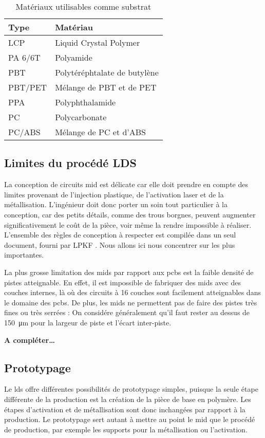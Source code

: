 \begin{table}[h]
\centering
\begin{tabular}{l l}
\toprule 
Type & Matériau \\
\midrule %
LCP & Liquid Crystal Polymer \\
PA 6/6T & Polyamide \\
PBT & Polytéréphtalate de butylène \\
PBT/PET & Mélange de PBT et de PET \\
PPA & Polyphthalamide \\
PC & Polycarbonate \\
PC/ABS & Mélange de PC et d'ABS \\ 
\bottomrule 
\end{tabular}
\caption{Matériaux utilisables comme substrat}
\label{tab:mid-materials}
\end{table}

\subsection{Limites du procédé LDS}
La conception de circuits \gls{mid} est délicate car elle doit prendre en compte des limites provenant de l'injection plastique, de l'activation laser et de la métallisation.
L'ingénieur doit donc porter un soin tout particulier à la conception, car des petits détails, comme des trous borgnes, peuvent augmenter significativement le coût de la pièce, voir même la rendre impossible à réaliser.
L'ensemble des règles de conception à respecter est compilée dans un seul document, fourni par LPKF \cite{mid-design-rules}.
Nous allons ici nous concentrer sur les plus importantes.

La plus grosse limitation des \glspl{mid} par rapport aux \glspl{pcb} est la faible densité de pistes atteignable.
En effet, il est impossible de fabriquer des \glspl{mid} avec des couches internes, là où des circuits à 16 couches sont facilement atteignables dans le domaine des \glspl{pcb}.
De plus, les \glspl{mid} ne permettent pas de faire des pistes très fines ou très serrées : On considére généralement qu'il faut rester au dessus de \SI{150}{\micro\meter} pour la largeur de piste et l'écart inter-piste.

\textbf{A compléter\ldots}


\subsection{Prototypage}
Le \gls{lds} offre différentes possibilités de prototypage simples, puisque la seule étape différente de la production est la création de la pièce de base en polymère.
Les étapes d'activation et de métallisation sont donc inchangées par rapport à la production.
Le prototypage sert autant à mettre au point le \gls{mid} que le procédé de production, par exemple les supports pour la métallisation ou l'activation.

